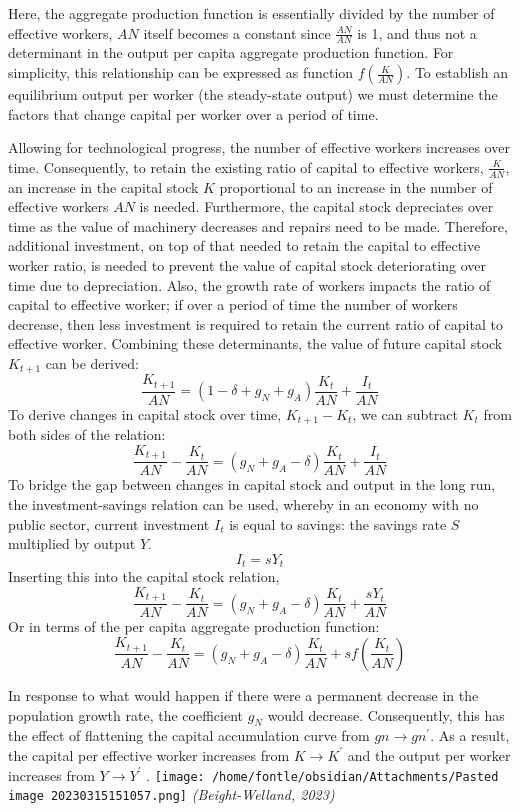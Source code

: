 \documentclass[
]{article}
\begin{document}
Here, the aggregate production function is essentially divided by the
number of effective workers, {\(AN\)} itself becomes a constant since
{\(\frac{AN}{AN}\)} is 1, and thus not a determinant in the output per
capita aggregate production function. For simplicity, this relationship
can be expressed as function {\(f\left( \frac{K}{AN} \right)\)}. To
establish an equilibrium output per worker (the steady-state output) we
must determine the factors that change capital per worker over a period
of time.

Allowing for technological progress, the number of effective workers
increases over time. Consequently, to retain the existing ratio of
capital to effective workers, {\(\frac{K}{AN}\)}, an increase in the
capital stock {\(K\)} proportional to an increase in the number of
effective workers {\(AN\)} is needed. Furthermore, the capital stock
depreciates over time as the value of machinery decreases and repairs
need to be made. Therefore, additional investment, on top of that needed
to retain the capital to effective worker ratio, is needed to prevent
the value of capital stock deteriorating over time due to depreciation.
Also, the growth rate of workers impacts the ratio of capital to
effective worker; if over a period of time the number of workers
decrease, then less investment is required to retain the current ratio
of capital to effective worker. Combining these determinants, the value
of future capital stock {\(K_{t + 1}\)} can be derived:
{\[\frac{K_{t + 1}}{AN} = (1 - \delta + g_{N} + g_{A})\frac{K_{t}}{AN} + \frac{I_{t}}{AN}\]}To
derive changes in capital stock over time, {\(K_{t + 1} - K_{t}\)}, we
can subtract {\(K_{t}\)} from both sides of the relation:
{\[\frac{K_{t + 1}}{AN} - \frac{K_{t}}{AN} = (g_{N} + g_{A} - \delta)\frac{K_{t}}{AN} + \frac{I_{t}}{AN}\]}To
bridge the gap between changes in capital stock and output in the long
run, the investment-savings relation can be used, whereby in an economy
with no public sector, current investment {\(I_{t}\)} is equal to
savings: the savings rate {\(S\)} multiplied by output {\(Y\)}.
{\[I_{t} = sY_{t}\]}Inserting this into the capital stock relation,
{\[\frac{K_{t + 1}}{AN} - \frac{K_{t}}{AN} = (g_{N} + g_{A} - \delta)\frac{K_{t}}{AN} + \frac{sY_{t}}{AN}\]}Or
in terms of the per capita aggregate production function:
{\[\frac{K_{t + 1}}{AN} - \frac{K_{t}}{AN} = (g_{N} + g_{A} - \delta)\frac{K_{t}}{AN} + sf\left( \frac{K_{t}}{AN} \right)\]}

In response to what would happen if there were a permanent decrease in
the population growth rate, the coefficient {\(g_{N}\)} would decrease.
Consequently, this has the effect of flattening the capital accumulation
curve from {\(gn \rightarrow gn^{\prime}\)}. As a result, the capital
per effective worker increases from {\(K \rightarrow K^{\prime}\)} and
the output per worker increases from {\(Y \rightarrow Y^{\prime}\)} .
\texttt{[image: /home/fontle/obsidian/Attachments/Pasted image 20230315151057.png]}
\emph{(Beight-Welland, 2023)}
\end{document}
